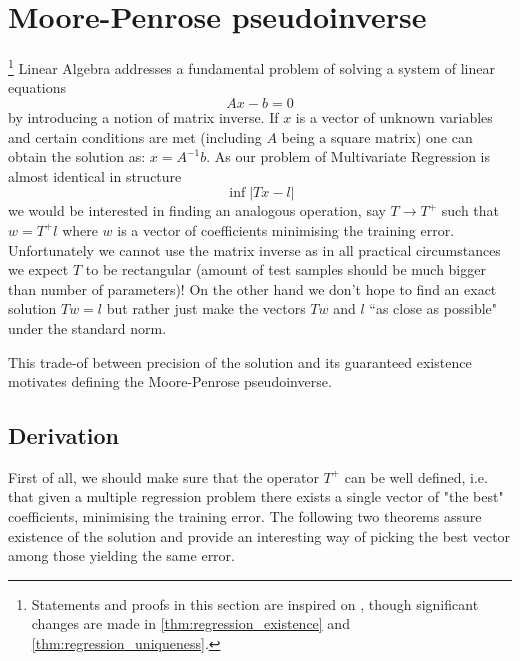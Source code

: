 \documentclass[a4paper]{article}
\theoremstyle{break}
\begin{document}
\section{Moore-Penrose pseudoinverse}
\footnote{Statements and proofs in this section are inspired on \cite[pp15-24]{albert}, though significant changes are made in \ref{thm:regression_existence} and \ref{thm:regression_uniqueness}.}
Linear Algebra addresses a fundamental problem of solving a system of linear equations
$$ A x - b = 0$$
by introducing a notion of matrix inverse. If $x$ is a vector of unknown variables and certain conditions are met (including $A$ being a square matrix) one can obtain the solution as: $ x = A^{-1} b $. As our problem of Multivariate Regression is almost identical in structure
$$ \inf | T x - l | $$
we would be interested in finding an analogous operation, say $ T \to T^+$ such that $ w = T^+ l$ where $w$ is a vector of coefficients minimising the training error. Unfortunately we cannot use the matrix inverse as in all practical circumstances we expect $T$ to be rectangular (amount of test samples should be much bigger than number of parameters)! On the other hand we don't hope to find an exact solution $ T w = l$ but rather just make the vectors $T w$ and $l$ ``as close as possible" under the standard norm.

This trade-of between precision of the solution and its guaranteed existence motivates defining the Moore-Penrose pseudoinverse.

\subsection{Derivation}
First of all, we should make sure that the operator $T^+$ can be well defined, i.e. that given a multiple regression problem there exists a single vector of "the best" coefficients, minimising the training error.
The following two theorems assure existence of the solution and provide an interesting way of picking the best vector among those yielding the same error.
\end{document}
